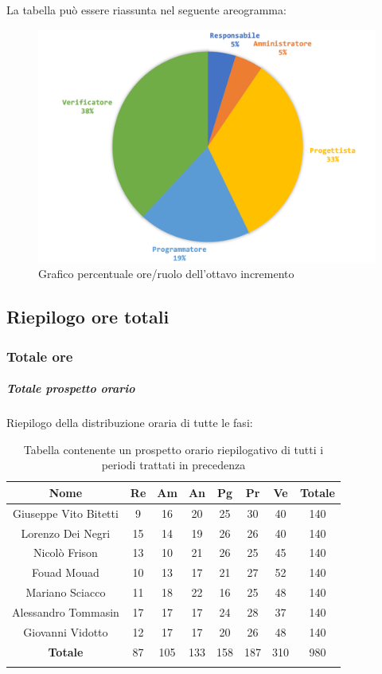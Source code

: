 		La tabella può essere riassunta nel seguente areogramma:
		\begin{figure}[H]
			\centering
			\includegraphics[width=0.8\linewidth]{./images/preventivo/incremento8-2.png}
			\caption{Grafico percentuale ore/ruolo dell'ottavo incremento}
			\label{fig:grafico costi ruolo incremento VIII}
		\end{figure}
		
		
		
		
		\subsection{Riepilogo ore totali}
			\subsubsection{Totale ore}
			\subparagraph{Totale prospetto orario }
			Riepilogo della distribuzione oraria di tutte le fasi:
			\begin{longtable}{|c|c|c|c|c|c|c|c|}
				\hline
				\rowcolor{lighter-grayer}
				\textbf{Nome} & \textbf{Re} & \textbf{Am} & \textbf{An} & \textbf{Pg}  & \textbf{Pr}   & \textbf{Ve} & \textbf{Totale} \\
				\hline
				\endfirsthead
				
				\hline
				Giuseppe Vito Bitetti 		& 9 & 16 & 20 & 25 & 30 & 40 & 140\\
				\hline
				\hline
				Lorenzo Dei Negri			& 15 & 14 & 19 & 26 & 26 & 40 & 140\\
				\hline
				\hline
				Nicolò Frison				    & 13 & 10 & 21 &26 & 25 & 45 & 140\\
				\hline
				\hline
				Fouad Mouad 				 & 10 & 13 & 17 & 21 & 27 & 52 & 140\\
				\hline
				\hline
				Mariano Sciacco 			& 11 & 18 & 22 & 16 & 25 & 48 & 140\\
				\hline
				\hline
				Alessandro Tommasin    & 17 & 17 & 17 & 24 & 28 & 37 & 140\\
				\hline
				\hline
				Giovanni Vidotto 			 & 12 & 17 & 17 & 20 & 26 & 48 & 140\\
				\hline 
				\textbf{Totale}				 & 87 & 105 & 133 & 158 & 187 & 310 & 980\\
				\hline
				\caption{Tabella contenente un prospetto orario riepilogativo di tutti i periodi trattati in precedenza}
			\end{longtable}
			\pagebreak
			
